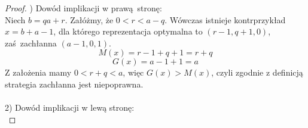 \documentclass[12pt]{article}
\begin{document}
\begin{titlepage}
\begin{proof}$ $) Dowód implikacji w prawą stronę:\\
Niech $b = qa + r$. Załóżmy, że $0 < r < a - q$. Wówczas istnieje
kontrprzykład $x = b + a - 1$, dla którego reprezentacja optymalna to
$(r - 1, q + 1, 0)$, zaś zachłanna $(a - 1, 0, 1)$.
$$M(x) = r - 1 + q + 1 = r + q$$
$$G(x) = a - 1 + 1 = a$$
Z założenia mamy $0 < r + q < a$, więc $G(x) > M(x)$, czyli zgodnie z definicją
strategia zachłanna jest niepoprawna.\\\\
2) Dowód implikacji w lewą stronę:\\
\end{proof}

\end{titlepage}
\end{document}
